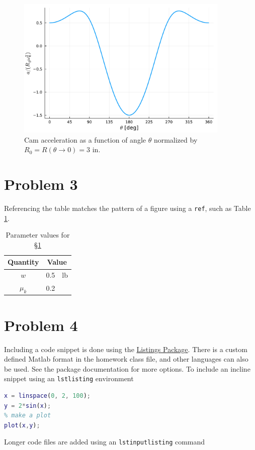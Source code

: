 \documentclass{homework}
\begin{document}
\begin{figure}[h!]
    \centering
    \includegraphics[width=4in]{examplefig}
    \caption{Cam acceleration as a function of angle $\theta$ normalized by $R_0 = R(\theta\to 0) = 3\text{ in}$.}
    \label{fig:cam:accel}
\end{figure}

\newpage
\section{Problem 3}\label{sec:p3}
Referencing the table matches the pattern of a figure using a \texttt{ref}, such as Table \ref{tab:cam}.


\begin{table}[h]
  \caption{Parameter values for \S\ref{sec:p3}}
    \label{tab:cam}
    \begin{center}
      \begin{tabular}{crl}
        \toprule
        \textbf{Quantity} & \multicolumn{2}{c}{\textbf{Value}} \\
        \midrule
        $w$     &  0.5  & lb \\
        $\mu_k$ &  0.2  &  \\
        \bottomrule
      \end{tabular}
  \end{center}
\end{table}


\newpage
\section{Problem 4}\label{sec:p4}
Including a code snippet is done using the \href{https://www.overleaf.com/learn/latex/Code_listing}{Listings Package}.
There is a custom defined Matlab format in the homework class file, and other languages can also be used.
See the package documentation for more options.
To include an incline snippet using an \texttt{lstlisting} environment

\begin{lstlisting}[language=Matlab]
x = linspace(0, 2, 100);
y = 2*sin(x);
% make a plot
plot(x,y);
\end{lstlisting}

Longer code files are added using an \texttt{lstinputlisting} command 




\printbibliography
\end{document}
